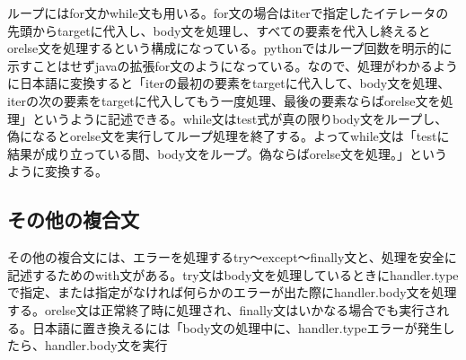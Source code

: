 ループにはfor文かwhile文も用いる。for文の場合はiterで指定したイテレータの先頭からtargetに代入し、body文を処理し、すべての要素を代入し終えるとorelse文を処理するという構成になっている。pythonではループ回数を明示的に示すことはせずjavaの拡張for文のようになっている。なので、処理がわかるように日本語に変換すると「iterの最初の要素をtargetに代入して、body文を処理、iterの次の要素をtargetに代入してもう一度処理、最後の要素ならばorelse文を処理」というように記述できる。while文はtest式が真の限りbody文をループし、偽になるとorelse文を実行してループ処理を終了する。よってwhile文は「testに結果が成り立っている間、body文をループ。偽ならばorelse文を処理。」というように変換する。

\subsection{その他の複合文}

その他の複合文には、エラーを処理するtry～except～finally文と、処理を安全に記述するためのwith文がある。try文はbody文を処理しているときにhandler.typeで指定、または指定がなければ何らかのエラーが出た際にhandler.body文を処理する。orelse文は正常終了時に処理され、finally文はいかなる場合でも実行される。日本語に置き換えるには「body文の処理中に、handler.typeエラーが発生したら、handler.body文を実行